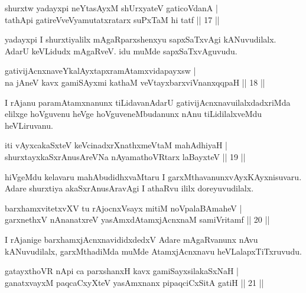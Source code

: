 \begin{shl}
shurxtw yadayxpi neYtasAyxM shUrxyateV gaticoVdanA |\\
tathA\s pi gatireVveVyamutatxratarx suPxTaM hi tatf \hfill || 17 || 
\end{shl}

\begin{artha}
yadayxpi I shurxtiyalilx mAgaRparxshenxyu sapxSaTxvAgi kANuvudilalx. AdarU keVLidudx mAgaRveV. idu muMde sapxSaTxvAguvudu.
\end{artha}

\begin{shl}
gativijAcnxnaveYkalAyxtapxramAtamxvidapayxsw |\\
na jAneV kavx gamiSAyxmi kathaM veVtayxbarxviVnanxqqpaH \hfill || 18 || 
\end{shl}

\begin{artha}
I rAjanu paramAtamxnanunx tiLidavanAdarU gativijAcnxnavu\break ilalxdadxriMda elilxge hoVguvenu heVge hoVguveneMbudanunx nAnu tiLidilalxveMdu heVLiruvanu.
\end{artha}


\begin{shl}
iti vAyxcakaSxteV keVcinadxrXnathxmeVtaM mahAdhiyaH |\\
shurxtayxkaSxrAnusAreVNa nAyamathoVR\s tarx laBayxteV \hfill || 19 || 
\end{shl}

\begin{artha}
hiVgeMdu kelavaru mahAbudidhxvaMtaru I garxMthavanunx\break vAyxKAyxnisuvaru. Adare shurxtiya akaSxrAnusAravAgi I athaRvu ililx doreyuvudilalx.
\end{artha}

\begin{shl}
barxhamxvitetxvXV tu rAjocnxV\s sayx mitiM noVpalaBAmaheV |\\
garxnethxV nAnanatxreV yasAmxdAtamxjAcnxnaM samiVritamf \hfill || 20 || 
\end{shl}

\begin{artha}
I rAjanige barxhamxjAcnxnavididxdedxV Adare mAgaRvanunx nAvu kANuvudilalx, garxMthadiMda muMde AtamxjAcnxnavu heVLalapxTiTxruvudu. 
\end{artha}

\begin{shl}
gatayxthoVR nApi ca parxshanxH kavx gamiSayxsilakaSxNaH |\\
ganatxvayxM paqcaCxyXteV yasAmxnanx pipaqciCxSitA gatiH \hfill || 21 || 
\end{shl}

